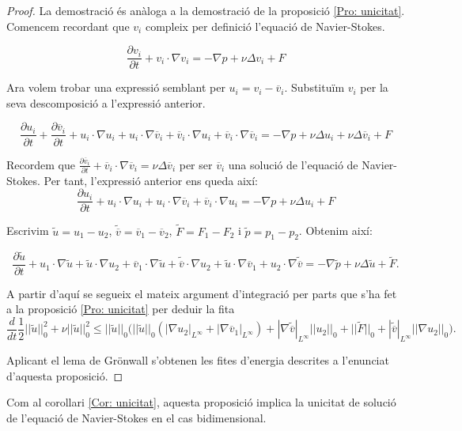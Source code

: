 \documentclass{article}
\numberwithin{equation}{section}
\begin{document}
\begin{proof}
La demostraci\'{o} \'{e}s an\`{a}loga a la demostraci\'{o} de la proposici\'{o} \ref{Pro: unicitat}. Comencem recordant que $v_i$ compleix per definici\'{o} l'equaci\'{o} de Navier-Stokes.

\[\frac{\partial v_i}{\partial t}+v_i\cdot\nabla v_i=-\nabla p+\nu\Delta v_i+F\]

Ara volem trobar una expressi\'{o} semblant per $u_i=v_i-\overline v_i$. Substitu\"{i}m $v_i$ per la seva descomposici\'{o} a l'expressi\'{o} anterior.

\[\frac{\partial u_i}{\partial t}+\frac{\partial\overline v_i}{\partial t}+u_i\cdot\nabla u_i+u_i\cdot\nabla\overline v_i+\overline v_i\cdot\nabla u_i+\overline v_i\cdot\nabla\overline v_i=-\nabla p+\nu\Delta u_i+\nu\Delta\overline v_i+F\]

Recordem que $\frac{\partial\overline v_i}{\partial t}+\overline v_i\cdot\nabla\overline v_i=\nu\Delta\overline v_i$ per ser $\overline v_i$ una soluci\'{o} de l'equaci\'{o} de Navier-Stokes. Per tant, l'expressi\'{o} anterior ens queda aix\'{i}:
\[\frac{\partial u_i}{\partial t}+u_i\cdot\nabla u_i+u_i\cdot\nabla\overline v_i+\overline v_i\cdot\nabla u_i=-\nabla p+\nu\Delta u_i+F\]

Escrivim $\tilde u=u_1-u_2$, $\tilde{\overline v}=\overline v_1-\overline v_2$, $\tilde F=F_1-F_2$ i $\tilde p=p_1-p_2$. Obtenim aix\'{i}:

\[\frac{\partial\tilde u}{\partial t}+u_1\cdot\nabla\tilde u+\tilde u\cdot\nabla u_2+\overline v_1\cdot\nabla\tilde u+\tilde{\overline v}\cdot\nabla u_2+\tilde u\cdot\nabla\overline v_1+u_2\cdot\nabla\tilde{\overline v}=-\nabla\tilde p+\nu\Delta\tilde u+\tilde F.\]

A partir d'aqu\'{i} se segueix el mateix argument d'integraci\'{o} per parts que s'ha fet a la proposici\'{o} \ref{Pro: unicitat} per deduir la fita
\[\frac{d}{dt}\frac{1}{2}||\tilde u||_0^2+\nu||\tilde u||_0^2\leq||\tilde u||_0\Big(||\tilde u||_0(|\nabla u_2|_{L^{\infty}}+|\nabla\overline v_1|_{L^{\infty}})+|\nabla\tilde{\overline v}|_{L^{\infty}}||u_2||_0+||\tilde F||_0+|\tilde{\overline v}|_{L^{\infty}}||\nabla u_2||_0\Big).\]

Aplicant el lema de Gr\"{o}nwall s'obtenen les fites d'energia descrites a l'enunciat d'aquesta proposici\'{o}.
\end{proof}

Com al corol\textperiodcentered lari \ref{Cor: unicitat}, aquesta proposici\'{o} implica la unicitat de soluci\'{o} de l'equaci\'{o} de Navier-Stokes en el cas bidimensional.
\end{document}
